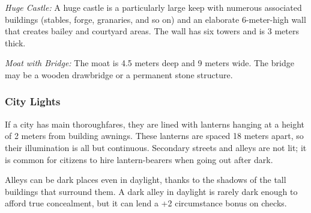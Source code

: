 \textit{Huge Castle:} A huge castle is a particularly large keep with numerous associated buildings (stables, forge, granaries, and so on) and an elaborate 6-meter-high wall that creates bailey and courtyard areas. The wall has six towers and is 3 meters thick.

\textit{Moat with Bridge:} The moat is 4.5 meters deep and 9 meters wide. The bridge may be a wooden drawbridge or a permanent stone structure.

\subsubsection{City Lights}
If a city has main thoroughfares, they are lined with lanterns hanging at a height of 2 meters from building awnings. These lanterns are spaced 18 meters apart, so their illumination is all but continuous. Secondary streets and alleys are not lit; it is common for citizens to hire lantern-bearers when going out after dark.

Alleys can be dark places even in daylight, thanks to the shadows of the tall buildings that surround them. A dark alley in daylight is rarely dark enough to afford true concealment, but it can lend a +2 circumstance bonus on  checks.
